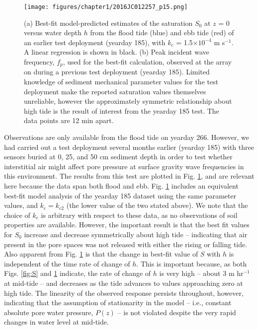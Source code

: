 \begin{figure} %
		\begin{center}	
		\noindent\texttt{[image: figures/chapter1/2016JC012257\_p15.png]}
	\caption[Best-fit saturation values: flood and ebb tides]{(a) Best-fit model-predicted estimates of the saturation $S_0$ at $z$ = 0 versus water depth $h$ from the flood tide (blue) and ebb tide (red) of an earlier test deployment (yearday 185), with $k_c$ = 1.5$\times10^{-4}$ m s$^{-1}$. A linear regression is shown in black. (b) Peak incident wave frequency, $f_{p}$, used for the best-fit calculation, observed at the array on during a previous test deployment (yearday 185). Limited knowledge of sediment mechanical parameter values for the test deployment make the reported saturation values themselves unreliable, however the approximately symmetric relationship about high tide is the result of interest from the yearday 185 test. The data points are 12 min apart.} 
	\label{fig:S2}
		\end{center}
\end{figure}

Observations are only available from the flood tide on yearday 266. However, we had carried out a test deployment several months earlier (yearday 185) with three sensors buried at 0, 25, and 50 cm sediment depth in order to test whether interstitial air might affect pore pressure at surface gravity wave frequencies in this environment. The results from this test are plotted in Fig. \ref{fig:S2}, and are relevant here because the data span both flood and ebb. Fig. \ref{fig:S2} includes an equivalent best-fit model analysis of the yearday 185 dataset using the same parameter values, and $k_{c}=k_{c2}$ (the lower value of the two stated above). We note that the choice of $k_c$ is arbitrary with respect to these data, as no observations of soil properties are available. However, the important result is that the best fit values for $S_0$ increase and decrease symmetrically about high tide -- indicating that air present in the pore spaces was not released with either the rising or falling tide. Also apparent from Fig. \ref{fig:S2} is that the change in best-fit value of $S$ with $h$ is independent of the time rate of change of $h$. This is important because, as both Figs. \ref{fig:S} and \ref{fig:S2} indicate, the rate of change of $h$ is very high -- about 3 m hr$^{-1}$ at mid-tide -- and decreases as the tide advances to values approaching zero at high tide. The linearity of the observed response persists throughout, however, indicating that the assumption of stationarity in the model -- i.e., constant absolute pore water pressure, $P(z)$ -- is not violated despite the very rapid changes in water level at mid-tide.


